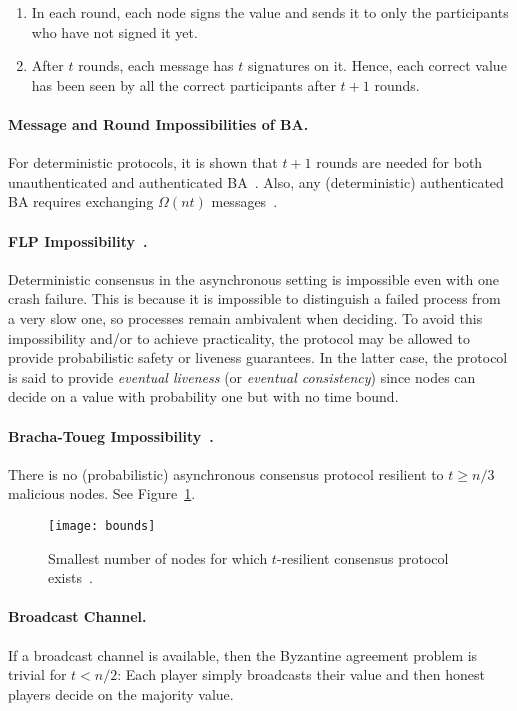 \documentclass[11pt]{article}
\theoremstyle{mytheoremstyle}
\begin{document}
\begin{enumerate}
	\item In each round, each node signs the value and sends it to only the participants who have not signed it yet.
	\item After $t$ rounds, each message has $t$ signatures on it. Hence, each correct value has been seen by all the correct participants after $t+1$ rounds.
\end{enumerate}

\paragraph{Message and Round Impossibilities of BA.}
For deterministic protocols, it is shown that $t+1$ rounds are needed for both unauthenticated and authenticated BA~\cite{FischerLynch81,Dolev:1982:STOC}. Also, any (deterministic) authenticated BA requires exchanging $\Omega(nt)$ messages~\cite{dolev:reischuk:82}.

\paragraph{FLP Impossibility~\cite{FLP}.} Deterministic consensus in the asynchronous setting is impossible even with one crash failure. This is because it is impossible to distinguish a failed process from a very slow one, so processes remain ambivalent when deciding. To avoid this impossibility and/or to achieve practicality, the protocol may be allowed to provide probabilistic safety or liveness guarantees. In the latter case, the protocol is said to provide \emph{eventual liveness} (or \emph{eventual consistency}) since nodes can decide on a value with probability one but with no time bound.

\paragraph{Bracha-Toueg Impossibility~\cite{Bracha:Toueg:1983}.} There is no (probabilistic) asynchronous consensus protocol resilient to $t \geq n/3$ malicious nodes. See Figure~\ref{fig:bounds}.

\begin{figure}
	\centering
	\texttt{[image: bounds]}
	\caption{Smallest number of nodes for which $t$-resilient consensus protocol exists~\cite{dwork:1988:cpp}.}
	\label{fig:bounds}
\end{figure}

\paragraph{Broadcast Channel.} If a broadcast channel is available, then the Byzantine agreement problem is trivial for $t<n/2$: Each player simply broadcasts their value and then honest players decide on the majority value.
\end{document}
